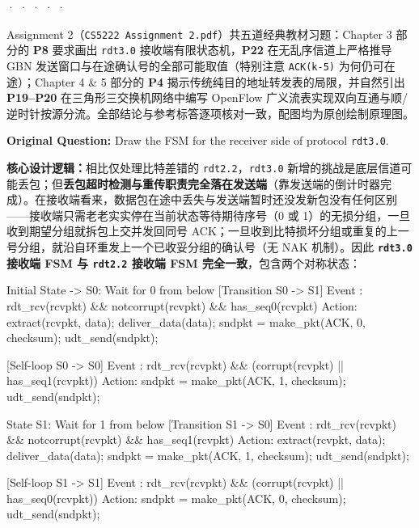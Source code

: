 

 ·  ·  ·  ·  · 


Assignment 2（\texttt{CS5222 Assignment 2.pdf}）共五道经典教材习题：Chapter 3 部分的 \textbf{P8} 要求画出 \texttt{rdt3.0} 接收端有限状态机，\textbf{P22} 在无乱序信道上严格推导 GBN 发送窗口与在途确认号的全部可能取值（特别注意 \texttt{ACK(k-5)} 为何仍可在途）；Chapter 4 \& 5 部分的 \textbf{P4} 揭示传统纯目的地址转发表的局限，并自然引出 \textbf{P19–P20} 在三角形三交换机网络中编写 OpenFlow 广义流表实现双向互通与顺/逆时针按源分流。全部结论与参考标答逐项核对一致，配图均为原创绘制原理图。



\textbf{Original Question:} Draw the FSM for the receiver side of protocol \texttt{rdt3.0}.

\textbf{核心设计逻辑：}相比仅处理比特差错的 \texttt{rdt2.2}，\texttt{rdt3.0} 新增的挑战是底层信道可能丢包；但\textbf{丢包超时检测与重传职责完全落在发送端}（靠发送端的倒计时器完成）。在接收端看来，数据包在途中丢失与发送端暂时还没发新包没有任何区别——接收端只需老老实实停在当前状态等待期待序号（0 或 1）的无损分组，一旦收到期望分组就拆包上交并发回同号 ACK；一旦收到比特损坏分组或重复的上一号分组，就沿自环重发上一个已收妥分组的确认号（无 NAK 机制）。因此 \textbf{\texttt{rdt3.0} 接收端 FSM 与 \texttt{rdt2.2} 接收端 FSM 完全一致}，包含两个对称状态：

\begin{StudyCode}
Initial State -> S0: Wait for 0 from below
  [Transition S0 -> S1]
    Event : rdt_rcv(rcvpkt) && notcorrupt(rcvpkt) && has_seq0(rcvpkt)
    Action: extract(rcvpkt, data); deliver_data(data);
            sndpkt = make_pkt(ACK, 0, checksum); udt_send(sndpkt);

  [Self-loop S0 -> S0]
    Event : rdt_rcv(rcvpkt) && (corrupt(rcvpkt) || has_seq1(rcvpkt))
    Action: sndpkt = make_pkt(ACK, 1, checksum); udt_send(sndpkt);

State S1: Wait for 1 from below
  [Transition S1 -> S0]
    Event : rdt_rcv(rcvpkt) && notcorrupt(rcvpkt) && has_seq1(rcvpkt)
    Action: extract(rcvpkt, data); deliver_data(data);
            sndpkt = make_pkt(ACK, 1, checksum); udt_send(sndpkt);

  [Self-loop S1 -> S1]
    Event : rdt_rcv(rcvpkt) && (corrupt(rcvpkt) || has_seq0(rcvpkt))
    Action: sndpkt = make_pkt(ACK, 0, checksum); udt_send(sndpkt);
\end{StudyCode}

